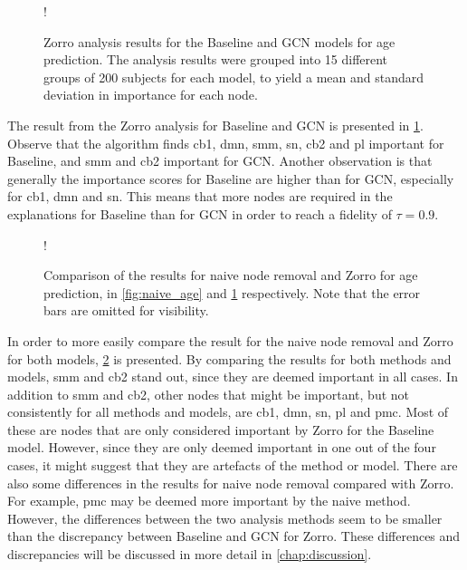 \begin{figure}[!htbp]
    \centering
    \begin{center}
    \resizebox {0.7\linewidth} {!} {
        
    }
    \end{center}
    \caption{Zorro analysis results for the Baseline and GCN models for age prediction. The analysis results were grouped into 15 different groups of 200 subjects for each model, to yield a mean and standard deviation in importance for each node.}
    \label{fig:zorro_age}
\end{figure}

The result from the Zorro analysis for Baseline and GCN is presented in \cref{fig:zorro_age}. Observe that the algorithm finds \acrshort{cb1}, \acrshort{dmn}, \acrshort{smm}, \acrshort{sn}, \acrshort{cb2} and \acrshort{pl} important for Baseline, and \acrshort{smm} and \acrshort{cb2} important for GCN. Another observation is that generally the importance scores for Baseline are higher than for GCN, especially for \acrshort{cb1}, \acrshort{dmn} and \acrshort{sn}. This means that more nodes are required in the explanations for Baseline than for GCN in order to reach a fidelity of $\tau=0.9$.

\begin{figure}[H]
    \centering
    \begin{center}
    \resizebox {0.7\linewidth} {!} {
        
    }
    \end{center}
    \caption{Comparison of the results for naive node removal and Zorro for age prediction, in \cref{fig:naive_age} and \cref{fig:zorro_age} respectively. Note that the error bars are omitted for visibility.}
    \label{fig:comparison_age}
\end{figure}

In order to more easily compare the result for the naive node removal and Zorro for both models, \cref{fig:comparison_age} is presented. By comparing the results for both methods and models, \acrshort{smm} and \acrshort{cb2} stand out, since they are deemed important in all cases. In addition to \acrshort{smm} and \acrshort{cb2}, other nodes that might be important, but not consistently for all methods and models, are \acrshort{cb1}, \acrshort{dmn}, \acrshort{sn}, \acrshort{pl} and \acrshort{pmc}. Most of these are nodes that are only considered important by Zorro for the Baseline model. However, since they are only deemed important in one out of the four cases, it might suggest that they are artefacts of the method or model.
There are also some differences in the results for naive node removal compared with Zorro. For example, \acrshort{pmc} may be deemed more important by the naive method. However, the differences between the two analysis methods seem to be smaller than the discrepancy between Baseline and GCN for Zorro. These differences and discrepancies will be discussed in more detail in \cref{chap:discussion}.


